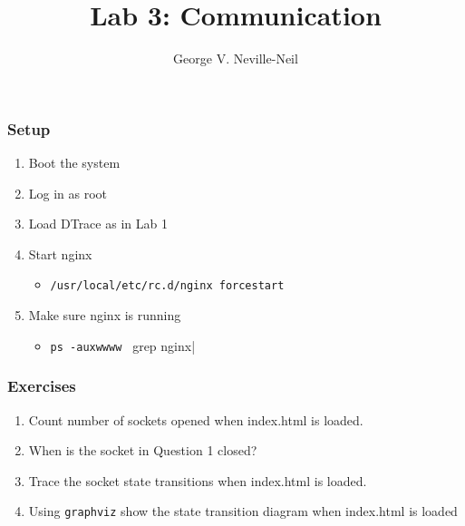 \documentclass[pdftex]{beamer}
\begin{document}

\title{Lab 3: Communication}
\author[shortname]{George V. Neville-Neil}

\begin{frame}[fragile]
  \frametitle{Setup}
  \begin{enumerate}
  \item Boot the system
  \item Log in as root
  \item Load DTrace as in Lab 1
  \item Start nginx
    \begin{itemize}
    \item \verb|/usr/local/etc/rc.d/nginx forcestart|
    \end{itemize}
  \item Make sure nginx is running
    \begin{itemize}
    \item \verb|ps -auxwwww | grep nginx|
    \end{itemize}
  \end{enumerate}
\end{frame}

\begin{frame}[fragile]
  \frametitle{Exercises}
  \begin{enumerate}
  \item Count number of sockets opened when index.html is loaded.
  \item When is the socket in Question 1 closed?
  \item Trace the socket state transitions when index.html is loaded.
  \item Using \texttt{graphviz} show the state transition diagram when
    index.html is loaded
  \end{enumerate}
\end{frame}
\end{document}

